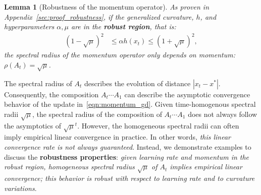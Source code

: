 \documentclass{article} %
\newtheorem{lemma}[theorem]{Lemma}
\newcommand{\mat}[1]{\bm{\mathit{#1}}}
\begin{document}
\begin{lemma}[Robustness of the momentum operator]
\label{lem:robustness}
As proven in Appendix~\ref{sec:proof_robustness}, if the generalized curvature, $h$, and hyperparameters $\alpha,\mu$ are in the {\bf robust region}, that is: 
\begin{align}
{(1-\sqrt{\mu})^2} &\leq \alpha h(x_t) \leq {(1+\sqrt{\mu})^2},
\label{eqn:robust_region}
\end{align}
the spectral radius of the momentum operator only depends on  momentum: $	\rho(\mat{A}_t) = \sqrt{\mu}
$. 
\end{lemma}
\vspace{-0.1em}
The spectral radius of $\mat{A}_t$ describes the evolution of distance $|x_t -x^*|$. Consequently, the composition $\mat{A}_t\cdots\mat{A}_1$ can describe the asymptotic convergence behavior of the update in~\eqref{eqn:momentum_gd}. 
Given time-homogenous spectral radii $\sqrt{\mu}$, the spectral radius of the composition of $\mat{A}_t\cdots\mat{A}_1$ does not always follow the asymptotics of $\sqrt{\mu}^t$. However, the homogeneous spectral radii can often imply empirical linear convergence in practice.
In other words, {\em this linear convergence rate is not always guaranteed}. Instead, we demonstrate examples to discuss the {\bf robustness properties}: \emph{given learning rate and momentum in the robust region, 
homogeneous spectral radius $\sqrt{\mu}$ of $\mat{A}_t$ implies empirical linear convergence; this behavior is robust with respect to learning rate and to curvature variations}.
\end{document}
